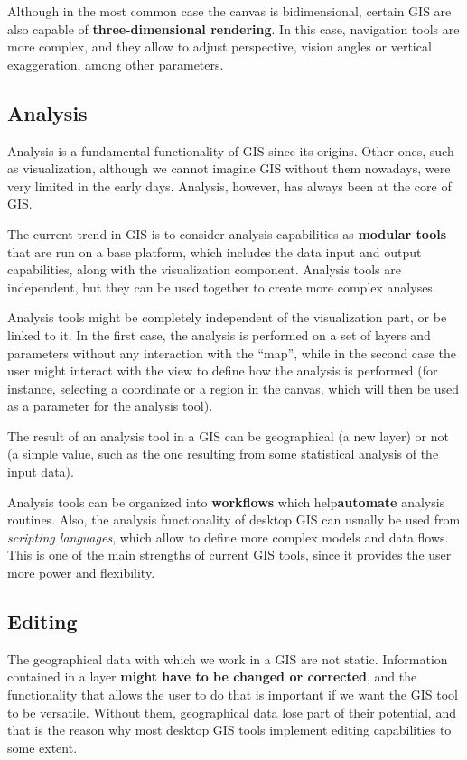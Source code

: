Although in the most common case the canvas is bidimensional, certain GIS are also capable of \textbf{three-dimensional rendering}. In this case, navigation tools are more complex, and they allow to adjust perspective, vision angles or vertical exaggeration, among other parameters.

\subsection{Analysis}

Analysis is a fundamental functionality of GIS since its origins. Other ones, such as visualization, although we cannot imagine GIS without them nowadays, were very limited in the early days. Analysis, however, has always been at the core of GIS.

The current trend in GIS is to consider analysis capabilities as \textbf{modular tools} that are run on a base platform, which includes the data input and output capabilities, along with the visualization component. Analysis tools are independent, but they can be used together to create more complex analyses.

Analysis tools might be completely independent of the visualization part, or be linked to it. In the first case, the analysis is performed on a set of layers and parameters without any interaction with the ``map'', while in the second case the user might interact with the view to define how the analysis is performed (for instance, selecting a coordinate or a region in the canvas, which will then be used as a parameter for the analysis tool).

The result of an analysis tool in a GIS can be geographical (a new layer) or not (a simple value, such as the one resulting from some statistical analysis of the input data).

Analysis tools can be organized into \textbf{workflows} which help\textbf{automate} analysis routines. Also, the analysis functionality of desktop GIS can usually be used from \emph{scripting languages}, which allow to define more complex models and data flows. This is one of the main strengths of current GIS tools, since it provides the user more power and flexibility.

\subsection{Editing}

The geographical data with which we work in a GIS are not static. Information contained in a layer \textbf{might have to be changed or corrected}, and the functionality that allows the user to do that is important if we want the GIS tool to be versatile. Without them, geographical data lose part of their potential, and that is the reason why most desktop GIS tools implement editing capabilities to some extent.

